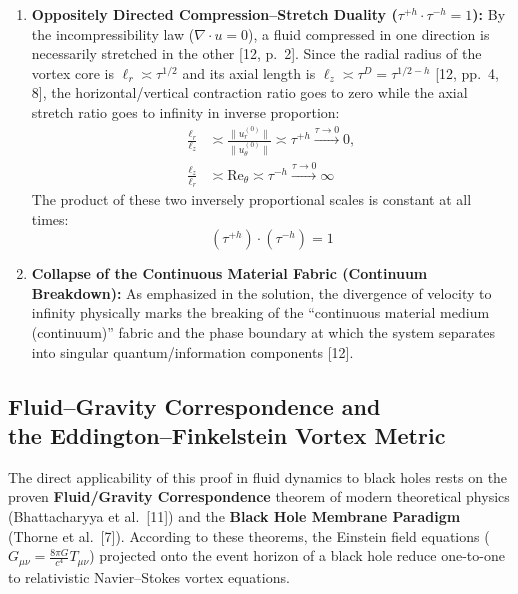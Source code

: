 \documentclass[12pt,a4paper]{article}
\begin{document}
\begin{enumerate}
    \item \textbf{Oppositely Directed Compression--Stretch Duality ($\tau^{+h} \cdot \tau^{-h} = 1$):} By the incompressibility law ($\nabla \cdot u = 0$), a fluid compressed in one direction is necessarily stretched in the other [12, p.\ 2]. Since the radial radius of the vortex core is $\ell_r \asymp \tau^{1/2}$ and its axial length is $\ell_z \asymp \tau^{D} = \tau^{1/2-h}$ [12, pp.\ 4, 8], the horizontal/vertical contraction ratio goes to zero while the axial stretch ratio goes to infinity in inverse proportion:
    \begin{equation}
    \begin{split}
    \frac{\ell_r}{\ell_z} &\asymp \frac{\|u_r^{(0)}\|}{\|u_\theta^{(0)}\|} \asymp \tau^{+h} \xrightarrow{\tau \to 0} 0, \\
    \frac{\ell_z}{\ell_r} &\asymp \text{Re}_\theta \asymp \tau^{-h} \xrightarrow{\tau \to 0} \infty
    \end{split}
    \end{equation}
    The product of these two inversely proportional scales is constant at all times:
    \begin{equation}
    \left(\tau^{+h}\right) \cdot \left(\tau^{-h}\right) = 1
    \end{equation}

    \item \textbf{Collapse of the Continuous Material Fabric (Continuum Breakdown):} As emphasized in the solution, the divergence of velocity to infinity physically marks the breaking of the ``continuous material medium (continuum)'' fabric and the phase boundary at which the system separates into singular quantum/information components [12].
\end{enumerate}

\subsection{Fluid--Gravity Correspondence and\\ the Eddington--Finkelstein Vortex Metric}

The direct applicability of this proof in fluid dynamics to black holes rests on the proven \textbf{Fluid/Gravity Correspondence} theorem of modern theoretical physics (Bhattacharyya et al.\ [11]) and the \textbf{Black Hole Membrane Paradigm} (Thorne et al.\ [7]). According to these theorems, the Einstein field equations ($G_{\mu\nu} = \frac{8\pi G}{c^4} T_{\mu\nu}$) projected onto the event horizon of a black hole reduce one-to-one to relativistic Navier--Stokes vortex equations.
\end{document}
